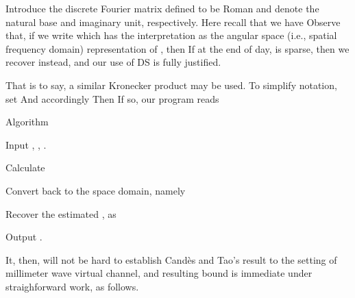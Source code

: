 \stopsubsection

\startsubsection [title={Expression for the Angular Space}]

Introduce the discrete Fourier matrix  defined to be
Roman  and  denote the natural base and imaginary unit, respectively.
Here recall that we have
Observe that, if we write
which has the interpretation as the angular space (i.e., spatial frequency domain) representation of , then
If at the end of day,  is sparse, then we recover  instead, and our use of DS is fully justified.

That is to say, a similar Kronecker product may be used.
To simplify notation, set
And accordingly
Then
If so, our program reads

\Result
{Algorithm}
{
\startitemize[n]
\item Input , , .
\item Calculate
\item Convert  back to the space domain, namely
\item Recover the estimated , as
\item Output .
\stopitemize
}

It, then, will not be hard to establish Cand\`es and Tao's result to the setting of millimeter wave virtual channel, and resulting bound is immediate under straighforward work, as follows.

\stopsubsection
\stopsection

\stopchapter
